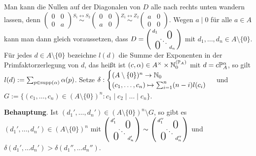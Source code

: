 \documentclass[../../main.tex]{subfiles}
\begin{document}
\begin{cproof}
Man kann die Nullen auf der Diagonalen von $D$ alle nach rechts unten wandern lassen, denn $\begin{pmatrix*}0&0\\ 0&a\end{pmatrix*}\stackrel{S_1\leftrightarrow S_2}{\sim}\begin{pmatrix*}0&0\\ a&0\end{pmatrix*}\stackrel{Z_1\leftrightarrow Z_2}{\sim}\begin{pmatrix*}a&0\\0&0\end{pmatrix*}$. Wegen $a\mid 0$ für alle $a\in A$ kann man dann gleich voraussetzen, dass $D= \left(\begin{smallmatrix}
d_1 & & \llap{$\overset{\blap{\LARGE 0}}{~}$} \\
& \ddots &\\
\rlap{\tlap{\LARGE 0}} & & d_n
\end{smallmatrix}\right)$ mit $d_1,\ldots ,d_n\in A\setminus\{0\}$. Für jedes $d\in A\setminus\{0\}$ bezeichne $l(d)$ die Summe der Exponenten in der Primfaktorzerlegung von $d$, das heißt ist $(c,\alpha)\in A^\times\times \expfam$ mit $d=c\P_A^\alpha$, so gilt $l(d):=\sum_{p\in\supp(\alpha)}\alpha(p)$. Setze $\delta:\begin{cases}(A\setminus\{0\})^n\to\N_0\\(c_1,\ldots ,c_n)\mapsto \sum_{i=1}^n(n-i)l(c_i)\end{cases}$ und $G:=\{(c_1,\ldots ,c_n)\in (A\setminus\{0\})^n: c_1\mid c_2\mid \ldots \mid c_n\}$.\\

\begin{tcolorbox}[arc=0mm, boxrule=0.2mm]\noindent\textbf{Behauptung}. Ist $(d_1',\ldots ,d_n')\in (A\setminus\{0\})^n\setminus G$, so gibt es $(d_1',\ldots ,d_n')\in (A\setminus\{0\})^n$ mit $\left(\begin{smallmatrix}
d'_1 & & \llap{$\overset{\blap{\LARGE 0}}{~}$} \\
& \ddots &\\
\rlap{\tlap{\LARGE 0}} & & d'_n
\end{smallmatrix}\right)\sim \left(\begin{smallmatrix}
d''_1 & & \llap{$\overset{\blap{\LARGE 0}}{~}$} \\
& \ddots &\\
\rlap{\tlap{\LARGE 0}} & & d''_n
\end{smallmatrix}\right)$ und $\delta(d_1',\ldots d_n')>\delta(d_1'',\ldots d_n'')$.\\


\end{tcolorbox}
\end{cproof}
\end{document}

